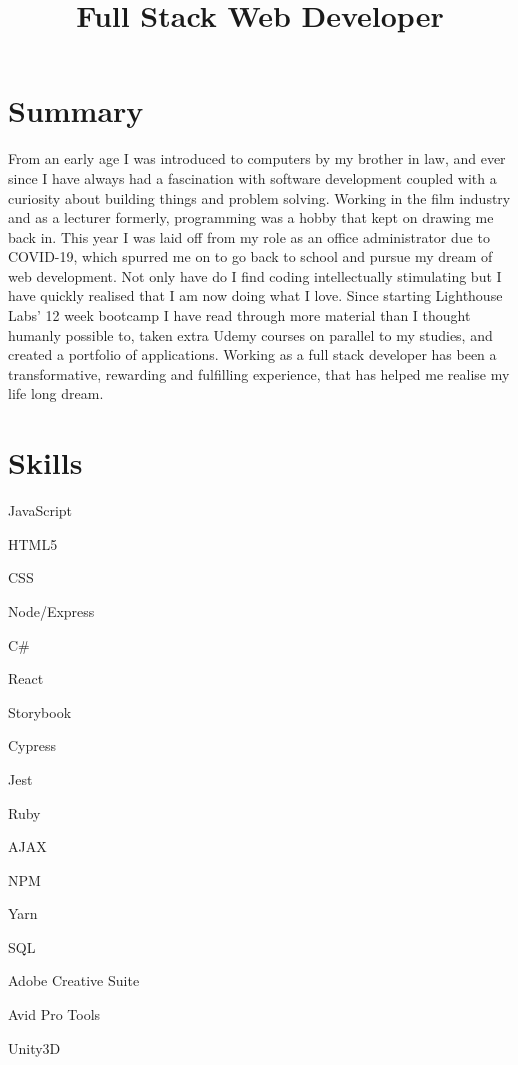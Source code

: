 \documentclass[11pt,a4paper,sans]{moderncv}
\title{Full Stack Web Developer} %
\begin{document}
\makecvtitle
\vspace{-2em}

\section{Summary} %
\label{sec:summary}

From an early age I was introduced to computers by my brother in law, and ever since I have always had a fascination with software development coupled with a curiosity about building things and problem solving. Working in the film industry and as a lecturer formerly, programming was a hobby that kept on drawing me back in. This year I was laid off from my role as an office administrator due to COVID-19, which spurred me on to go back to school and pursue my dream of web development. Not only have do I find coding intellectually stimulating but I have quickly realised that I am now doing what I love. Since starting Lighthouse Labs' 12 week bootcamp I have read through more material than I thought humanly possible to, taken extra Udemy courses on parallel to my studies, and created a portfolio of applications. Working as a full stack developer has been a transformative, rewarding and fulfilling experience, that has helped me realise my life long dream.

\section{Skills}
\begin{itemize}
\begin{multicols}{3}
\item JavaScript
\item HTML5
\item CSS
\item Node/Express
\item C\#
\item React
\item Storybook
\item Cypress
\item Jest
\item Ruby
\item AJAX
\item NPM
\item Yarn
\item SQL
\item Adobe Creative Suite
\item Avid Pro Tools
\item Unity3D
\end{multicols}
\end{itemize}
\end{document}
